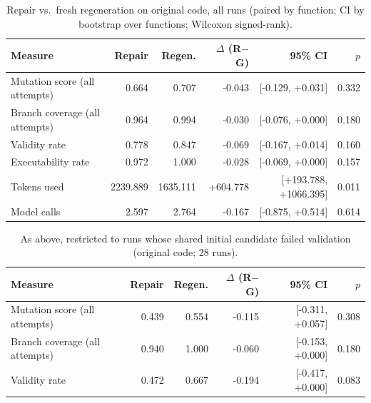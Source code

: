 \begin{table}[t]
\centering\small
\caption{Repair vs.\ fresh regeneration on original code, all runs (paired by function; CI by bootstrap over functions; Wilcoxon signed-rank).}
\label{tab:main-original}
\begin{tabular}{lrrrrr}
\toprule
Measure & Repair & Regen. & $\Delta$ (R$-$G) & 95\% CI & $p$ \\
\midrule
Mutation score (all attempts) & 0.664 & 0.707 & -0.043 & [-0.129, +0.031] & 0.332 \\
Branch coverage (all attempts) & 0.964 & 0.994 & -0.030 & [-0.076, +0.000] & 0.180 \\
Validity rate & 0.778 & 0.847 & -0.069 & [-0.167, +0.014] & 0.160 \\
Executability rate & 0.972 & 1.000 & -0.028 & [-0.069, +0.000] & 0.157 \\
Tokens used & 2239.889 & 1635.111 & +604.778 & [+193.788, +1066.395] & 0.011 \\
Model calls & 2.597 & 2.764 & -0.167 & [-0.875, +0.514] & 0.614 \\
\bottomrule
\end{tabular}
\end{table}

\begin{table}[t]
\centering\small
\caption{As above, restricted to runs whose shared initial candidate failed validation (original code; 28 runs).}
\label{tab:fail-original}
\begin{tabular}{lrrrrr}
\toprule
Measure & Repair & Regen. & $\Delta$ (R$-$G) & 95\% CI & $p$ \\
\midrule
Mutation score (all attempts) & 0.439 & 0.554 & -0.115 & [-0.311, +0.057] & 0.308 \\
Branch coverage (all attempts) & 0.940 & 1.000 & -0.060 & [-0.153, +0.000] & 0.180 \\
Validity rate & 0.472 & 0.667 & -0.194 & [-0.417, +0.000] & 0.083 \\
\bottomrule
\end{tabular}
\end{table}

